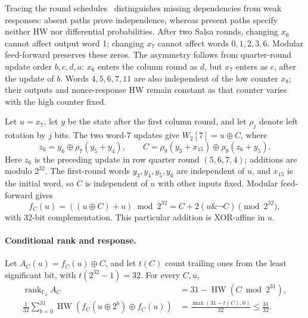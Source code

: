 \documentclass[electronics,article,submit,pdftex,oneauthor]{Definitions/mdpi}
\begin{document}
Tracing the round schedules~\citep{nir2018,bernstein2008salsa} distinguishes missing dependencies from weak responses: absent paths prove independence, whereas present paths specify neither HW nor differential probabilities. After two Salsa rounds, changing $x_6$ cannot affect output word 1; changing $x_7$ cannot affect words $0,1,2,3,6$. Modular feed-forward preserves these zeros. The asymmetry follows from quarter-round update order $b,c,d,a$: $x_6$ enters the column round as $d$, but $x_7$ enters as $c$, after the update of $b$. Words $4,5,6,7,11$ are also independent of the low counter $x_8$; their outputs and nonce-response HW remain constant as that counter varies with the high counter fixed.

Let $u=x_7$, let $y$ be the state after the first column round, and let $\rho_j$ denote left rotation by $j$ bits. The two word-7 updates give $W_2[7]=u\oplus C$, where
\[
 z_6=y_6\oplus\rho_7(y_5+y_4),\qquad
 C=\rho_9(y_3+x_{15})\oplus\rho_9(z_6+y_5).
\]
Here $z_6$ is the preceding update in row quarter round $(5,6,7,4)$; additions are modulo $2^{32}$. The first-round words $y_3,y_4,y_5,y_6$ are independent of $u$, and $x_{15}$ is the initial word, so $C$ is independent of $u$ with other inputs fixed. Modular feed-forward gives
\begin{equation}
 f_C(u)=((u\oplus C)+u)\bmod2^{32}
       =C+2(u\mathbin{\&}\neg C)\pmod{2^{32}},
 \label{eq:compactfC}
\end{equation}
with 32-bit complementation. This particular addition is XOR-affine in $u$.

\paragraph{Conditional rank and response.}
Let $A_C(u)=f_C(u)\oplus C$, and let $t(C)$ count trailing ones from the least significant bit, with $t(2^{32}-1)=32$. For every $C,u$,
\begin{equation}
\begin{aligned}
 \operatorname{rank}_{\mathbb F_2}A_C
   &=31-\operatorname{HW}(C\bmod2^{31}),\\
 \frac1{32}\sum_{b=0}^{31}\operatorname{HW}\!\left(f_C(u\oplus2^b)\oplus f_C(u)\right)
   &=\frac{\max(31-t(C),0)}{32}\leq\frac{31}{32}.
\end{aligned}
\label{eq:affinecorollary}
\end{equation}
\end{document}
